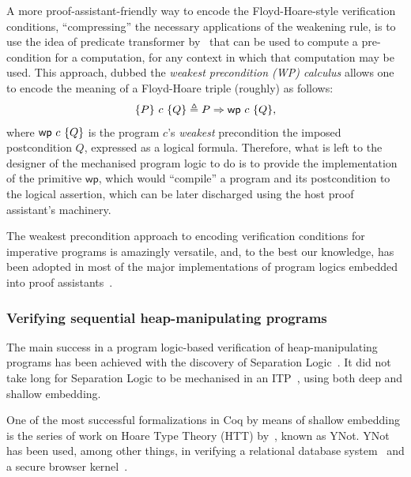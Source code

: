 A more proof-assistant-friendly way to encode the Floyd-Hoare-style
verification conditions, ``compressing'' the necessary applications of
the weakening rule, is to use the idea of predicate transformer
by~\citep{Dijkstra:CACM75} that can be used to compute a
pre-condition for a computation, for any context in which that
computation may be used.
%
This approach, dubbed the \emph{weakest precondition (WP) calculus} allows
one to encode the meaning of a Floyd-Hoare triple (roughly) as
follows:
%
\[
  \{P\}~c~\{Q\} \triangleq P \Rightarrow \mathsf{wp}~c~\{Q\},
\]
%
where $\mathsf{wp}~c~\{Q\}$ is the program $c$'s \emph{weakest}
precondition \wrt the imposed postcondition $Q$, expressed as a
logical formula.
%
Therefore, what is left to the designer of the mechanised program
logic to do is to provide the implementation of the primitive
$\mathsf{wp}$, which would ``compile'' a program and its postcondition
to the logical assertion, which can be later discharged using the host
proof assistant's machinery.

The weakest precondition approach to encoding verification
conditions for imperative programs is amazingly versatile, and, to the
best our knowledge, has been adopted in most of the major
implementations of program logics embedded into proof
assistants~\citep{Nanevski2008,mccreight2009practical,Nanevski-al:POPL10,Chargueraud2010,Chlipala:PLDI11,Swamy-al:PLDI13,Appel:BOOK14,Krebbers-al:POPL17}.

\subsubsection{Verifying sequential heap-manipulating programs}
\label{sec:reas-about-heap}

The main success in a program logic-based verification of
heap-manipulating programs has been achieved with the discovery of
Separation Logic~\citep{OHearn-al:CSL01,Reynolds:LICS02}.
%
It did not take long for Separation Logic to be mechanised in an ITP~\citep{Nanevski2008,Mehta-Nipkow:CADE03,mccreight2009practical},
using both deep and shallow embedding.

One of the most successful formalizations in Coq
by means of shallow embedding is the series of work on Hoare Type Theory
(HTT) by~\cite{Nanevski2008}, known as YNot. YNot has been used, among other things, in verifying
a relational database system~\citep{Malecha2010} and a secure browser kernel~\citep{Jang2012}.
%

